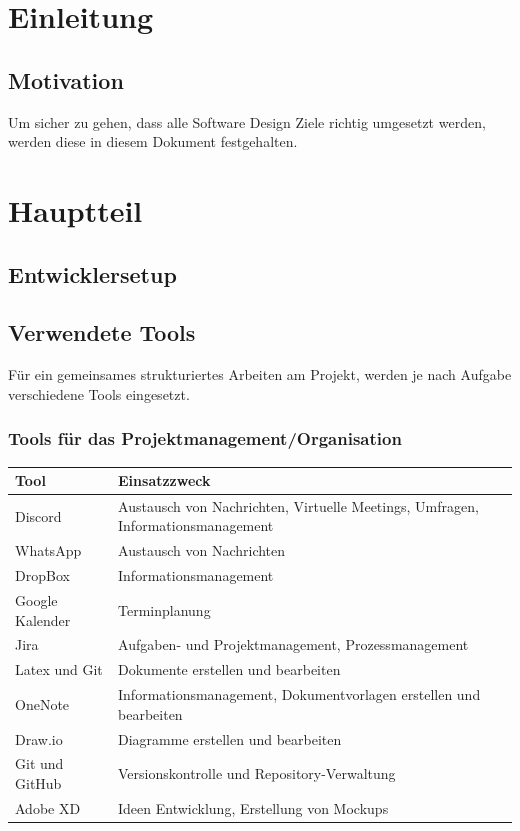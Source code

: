 \documentclass[a4paper,11pt]{scrartcl}
\begin{document}



\section{Einleitung}
	\subsection{Motivation} %
Um sicher zu gehen, dass alle Software Design Ziele richtig umgesetzt werden, werden diese in diesem Dokument festgehalten.

\section{Hauptteil}
	\subsection{Entwicklersetup}

	\subsection{Verwendete Tools}
Für ein gemeinsames strukturiertes Arbeiten am Projekt, werden je nach Aufgabe verschiedene Tools eingesetzt. 
		\subsubsection{Tools für das Projektmanagement/Organisation}
\begin{table}[H]
\begin{tabular}{|p{4cm}|p{8cm}|}
\hline
\textbf{Tool} &\textbf{Einsatzzweck} \\ \hline
Discord &  Austausch von Nachrichten, Virtuelle Meetings, Umfragen, Informationsmanagement\\ \hline
WhatsApp &  Austausch von Nachrichten\\ \hline
DropBox & Informationsmanagement \\ \hline
Google Kalender & Terminplanung   \\ \hline
Jira &  Aufgaben- und Projektmanagement, Prozessmanagement \\ \hline
Latex und Git &  Dokumente erstellen und bearbeiten \\ \hline
OneNote &  Informationsmanagement, Dokumentvorlagen erstellen und bearbeiten \\ \hline
Draw.io &  Diagramme erstellen und bearbeiten \\ \hline
Git und GitHub & Versionskontrolle und Repository-Verwaltung \\ \hline
Adobe XD & Ideen Entwicklung, Erstellung von Mockups \\ \hline
\end{tabular}
\end{table}
\end{document}
